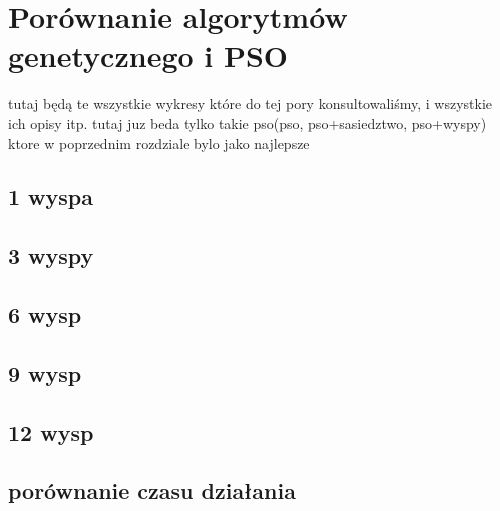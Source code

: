 \chapter{Porównanie algorytmów genetycznego i PSO}
\label{cha:psovsemas}


tutaj będą te wszystkie wykresy które do tej pory konsultowaliśmy, i wszystkie ich opisy itp.
tutaj juz beda tylko takie pso(pso, pso+sasiedztwo, pso+wyspy) ktore w poprzednim rozdziale bylo jako najlepsze


\section{1 wyspa}
\section{3 wyspy}
\section{6 wysp}
\section{9 wysp}
\section{12 wysp}
\section{porównanie czasu działania}
